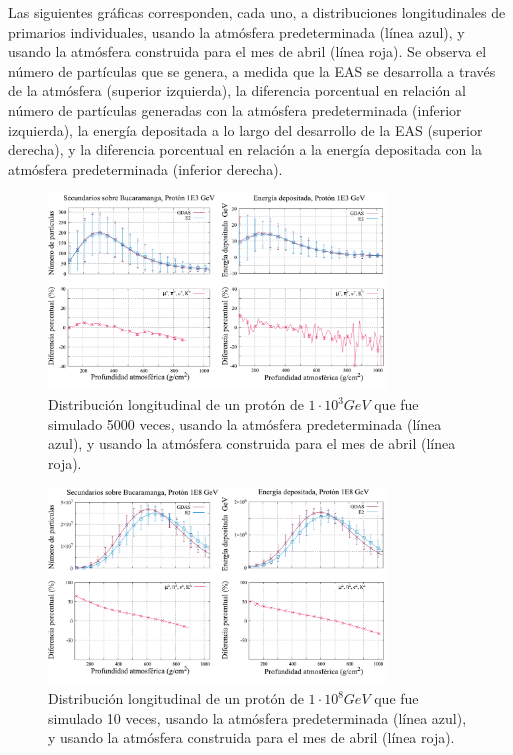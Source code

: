 \newpage
\newpage
{}\label{sec:apendiceC}


Las siguientes gráficas corresponden, cada uno, a distribuciones longitudinales de primarios individuales, usando la atmósfera predeterminada (línea azul), y usando la atmósfera construida para el mes de abril (línea roja). Se observa el número de partículas que se genera, a medida que la EAS se desarrolla a través de la atmósfera (superior izquierda), la diferencia porcentual en relación al número de partículas generadas con la atmósfera predeterminada (inferior izquierda), la energía depositada a lo largo del desarrollo de la EAS (superior derecha), y la diferencia porcentual en relación a la energía depositada con la atmósfera predeterminada (inferior derecha).

\begin{figure}[htb!]
\centering
\includegraphics[width=0.8\textwidth]{Figs/proton_1E3.pdf}
\caption[Distribución longitudinal de un protón de $1\cdot 10^{3}$ GeV.]{Distribución longitudinal de un protón de $1\cdot 10^{3} GeV$ que fue simulado 5000 veces, usando la atmósfera predeterminada (línea azul), y usando la atmósfera construida para el mes de abril (línea roja).}
\label{fig:fig26}
\end{figure}

\begin{figure}[htb!]
\centering
\includegraphics[width=0.8\textwidth]{Figs/proton_1E8.pdf}
\caption[Distribución longitudinal de un protón de $1\cdot 10^{8}$ GeV.]{Distribución longitudinal de un protón de $1\cdot 10^{8} GeV$ que fue simulado 10 veces, usando la atmósfera predeterminada (línea azul), y usando la atmósfera construida para el mes de abril (línea roja). }
\label{fig:fig26b}
\end{figure}


